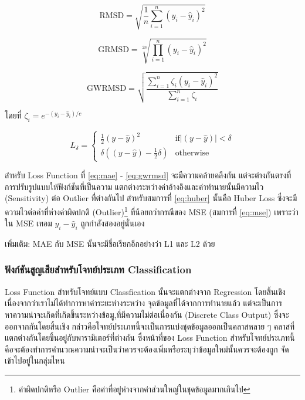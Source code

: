 \begin{equation}\label{eq:rmsd}
    \text{RMSD} = \sqrt{ \frac{1}{n} \sum_{i=1}^{n} (y_{i} - \hat{y}_{i})^{2} }
\end{equation}

\begin{equation}\label{eq:grmsd}
    \text{GRMSD} = \sqrt[2n]{ \prod_{i=1}^{n} (y_{i} - \hat{y}_{i})^{2} }
\end{equation}

\begin{equation}\label{eq:gwrmsd}
    \text{GWRMSD} = \sqrt{\frac{\sum_{i=1}^{n} \zeta_{i} (y_{i} - \hat{y}_{i})^{2}}{\sum_{i=1}^{n} \zeta_{i}}}
\end{equation}

\noindent โดยที่ $\zeta_{i} = e^{-(y_{i} - \hat{y}_{i}) / c}$

\begin{equation}\label{eq:huber}
    L_{\delta}=
    \left\{\begin{matrix}
        \frac{1}{2}(y - \hat{y})^{2}             & \text{if} \left | (y - \hat{y})  \right | < \delta \\
        \delta ((y - \hat{y}) - \frac1 2 \delta) & \text{otherwise}
    \end{matrix}\right.
\end{equation}

สำหรับ Loss Function ที่ \eqref{eq:mae} - \eqref{eq:gwrmsd} จะมีความคล้ายคลึงกัน แต่จะต่างกันตรงที่การปรับรูปแบบให้ฟังก์ชันที่เป็นความ%
แตกต่างระหว่างค่าอ้างอิงและค่าทำนายนั้นมีความไว (Sensitivity) ต่อ Outlier ที่ต่างกันไป สำหรับสมการที่ \eqref{eq:huber} นั้นคือ Huber
Loss ซึ่งจะมีความไวต่อค่าที่ห่างค่าผิดปกติ (Outlier)\footnote{ค่าผิดปกติหรือ Outlier คือค่าที่อยู่ห่างจากค่าส่วนใหญ่ในชุดข้อมูลมากเกินไป}
ที่น้อยกว่ากรณีของ MSE (สมการที่ \eqref{eq:mse}) เพราะว่าใน MSE เทอม $y_{i} - \hat{y}_{i}$ ถูกกำลังสองอยู่นั่นเอง

\noindent เพิ่มเติม: MAE กับ MSE นั้นจะมีชื่อเรียกอีกอย่างว่า L1 และ L2 ด้วย

\subsubsection{ฟังก์ชันสูญเสียสำหรับโจทย์ประเภท Classification}
\label{sssec:loss_func_class}

Loss Function สำหรับโจทย์แบบ Classfication นั้นจะแตกต่างจาก Regression โดยสิ้นเชิงเนื่องจากว่าเราไม่ได้ทำการหาค่าระยะห่างระหว่าง%
จุดข้อมูลที่ได้จากการทำนายแล้ว แต่จะเป็นการหาความน่าจะเกิดที่เกิดขึ้นระหว่างข้อมู,ที่มีความไม่ต่อเนื่องกัน (Discrete Class Output) ซึ่งจะ%
ออกจากกันโดยสิ้นเชิง กล่าวคือโจทย์ประเภทนี้จะเป็นการแบ่งชุดข้อมูลออกเป็นคลาสหลาย ๆ คลาสที่แตกต่างกันโดยขึ้นอยู่กับพารามิเตอร์ที่ต่างกัน
ซึ่งหน้าที่ของ Loss Function สำหรับโจทย์ประเภทนี้คือจะต้องทำการคำนวณความน่าจะเป็นว่าควรจะต้องเพิ่มหรือระบุว่าข้อมูลใหม่นั้นควรจะต้องถูก%
จัดเข้าไปอยู่ในกลุ่มไหน

